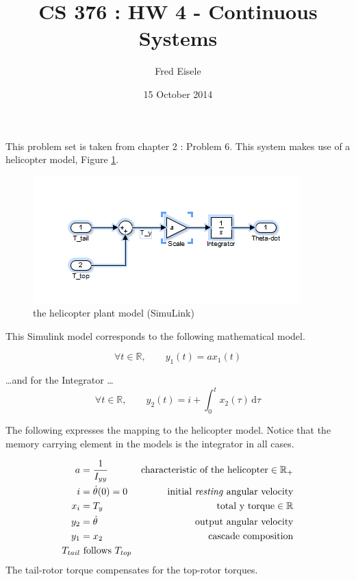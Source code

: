 \documentclass{article}
\title{CS 376 : HW 4 - Continuous Systems}
\author{Fred Eisele }
\date{15 October 2014 }
\begin{document}
\maketitle

This problem set is taken from \citep{IntroEmbedSys} chapter 2 : Problem 6.
This system makes use of a helicopter model,
Figure \ref{fig:helicopter_plant}.

\begin{figure}[h!]
\centering
\includegraphics[scale=0.8]{helicopter_model.png}
\caption{the helicopter plant model (SimuLink)}
\label{fig:helicopter_plant}
\end{figure}

This Simulink model corresponds to the following mathematical model.

\begin{equation}
\forall t \in \mathbb{R} ,  \qquad
y_1(t) = a x_1(t)
\end{equation}

\ldots and for the Integrator \ldots
\begin{equation}
\forall t \in \mathbb{R},  \qquad
y_2(t) = i + \int_0^t x_2(\tau) \, \mathrm{d}\tau
\end{equation}

The following expresses the mapping to the helicopter model.
Notice that the memory carrying element in the models is the integrator in all cases.

\begin{align}
a & = \frac{1}{I_{yy}} & \text{characteristic of the helicopter} \in \mathbb{R}_+ \\
i & = \dot{\theta}(0) = 0 & \text{initial \emph{resting} angular velocity} \\
x_i & = T_y        & \text{total y torque} \in \mathbb{R} \\
y_2 & = \dot{\theta} & \text{output angular velocity} \\
y_1 & = x_2   &  \text{cascade composition} \\
T_{tail} &  \text{  follows  } T_{top}
\end{align}
The tail-rotor torque compensates for the top-rotor torques.
\end{document}
